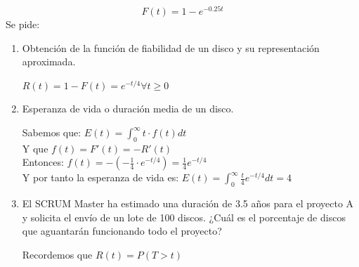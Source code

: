 \[F(t)=1-e^{-0.25t}\]
Se pide:
\begin{enumerate}
    \item Obtención de la función de fiabilidad de un disco y su representación aproximada.
    \begin{tcolorbox}[colback=white,colframe=cyan!50!black,fonttitle=\bfseries]
    $R(t) = 1 - F(t) = e^{-t/4}$\quad$\forall t \geq 0$\\
    \begin{center}
    \end{center}
        
    \end{tcolorbox}
    \item Esperanza de vida o duración media de un disco.
    \begin{tcolorbox}[colback=white,colframe=cyan!50!black,fonttitle=\bfseries]
    Sabemos que: $E(t)= \int_0^{\infty}t\cdot f(t)dt$\\
    Y que $f(t) = F'(t) = -R'(t)$\\
    
    Entonces: $f(t) = -(-\frac{1}{4}\cdot e^{-t/4})= \frac{1}{4}e^{-t/4}$\\
    
    Y por tanto la esperanza de vida es: $E(t)= \int_0^{\infty}\frac{t}{4}e^{-t/4}dt = 4$
    \end{tcolorbox}
    \item El SCRUM Master ha estimado una duración de 3.5 años para el proyecto A y solicita el envío de un lote de 100 discos. ¿Cuál es el porcentaje de discos que aguantarán funcionando todo el proyecto?
    \begin{tcolorbox}[colback=white,colframe=cyan!50!black,fonttitle=\bfseries]
    Recordemos que $R(t)= P(T>t)$\\
    

\end{tcolorbox}
\end{enumerate}
